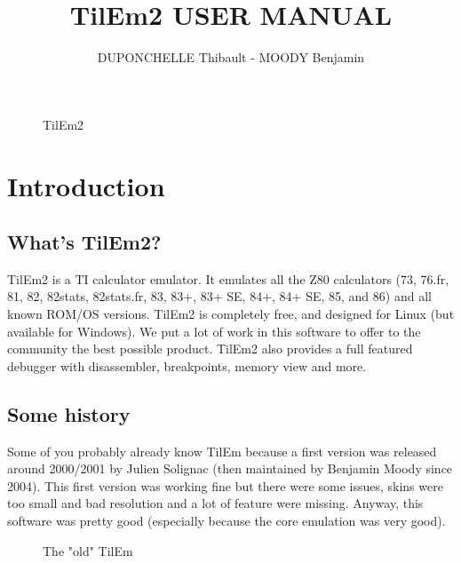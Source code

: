 \documentclass[10pt]{report}
\title {TilEm2 USER MANUAL}
\author {DUPONCHELLE Thibault - MOODY Benjamin}
\begin{document}
\maketitle

\begin{figure}[H]
\centering
{}
\caption{TilEm2}
\end{figure}

\tableofcontents

\chapter{Introduction}
\section{What's TilEm2?}
TilEm2 is a TI calculator emulator. It emulates all the Z80 calculators (73, 76.fr, 81, 82, 82stats, 82stats.fr, 83, 83+, 83+ SE, 84+, 84+ SE, 85, and 86) and all known ROM/OS versions.\newline
TilEm2 is completely free, and designed for Linux (but available for Windows).\newline
We put a lot of work in this software to offer to the community the best possible product.\newline
TilEm2 also provides a full featured debugger with disassembler, breakpoints, memory view and more.\newline


\section{Some history}
Some of you probably already know TilEm because a first version was released around 2000/2001 by Julien Solignac (then maintained by Benjamin Moody since 2004).\newline
This first version was working fine but there were some issues, skins were too small and bad resolution and a lot of feature were missing.\newline
Anyway, this software was pretty good (especially because the core emulation was very good).\newline

\begin{figure}[H]
\centering
{}
\caption{The "old" TilEm}
\end{figure}
\end{document}
